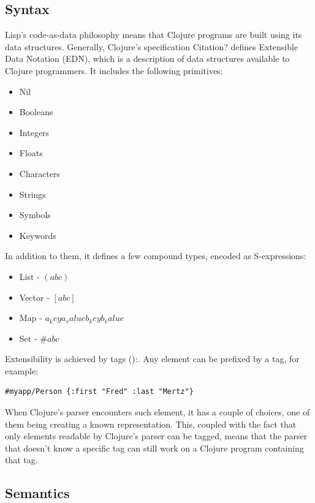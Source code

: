 \documentclass[11pt]{scrartcl}
\begin{document}
\subsection{Syntax}
Lisp’s code-as-data philosophy means that Clojure programs are built using its data structures. Generally, Clojure’s specification {Citation?} defines Extensible Data Notation (EDN), which is a description of data structures available to Clojure programmers. It includes the following primitives:
\begin{itemize}
  \item Nil
  \item Booleans
  \item Integers
  \item Floats
  \item Characters
  \item Strings
  \item Symbols
  \item Keywords
\end{itemize}
In addition to them, it defines a few compound types, encoded as S-expressions:
\begin{itemize}
  \item List - $(a b c) $
  \item Vector - $[a b c]$
  \item Map - ${a_key a_value b_key b_value}$
  \item Set - $\#{a b c}$
\end{itemize}
Extensibility is achieved by tags (\cite{edn_format}):. Any element can be prefixed by a tag, for example:
\begin{lstlisting}
#myapp/Person {:first "Fred" :last "Mertz"} 
\end{lstlisting}
When Clojure’s parser encounters such element, it has a couple of choices, one of them being creating a known representation. This, coupled with the fact that only elements readable by Clojure’s parser can be tagged, means that the parser that doesn’t know a specific tag can still work on a Clojure program containing that tag.

\subsection{Semantics}
\end{document}
